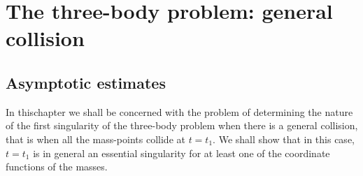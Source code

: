 \chapter{The three-body problem: general collision}\label{chap3}

\section{Asymptotic estimates}\label{chap3:sec1}

In this\pageoriginale chapter we shall be concerned with the problem
of determining the nature of the first singularity of the three-body
problem when there is a general collision, that is when all the
mass-points collide at $t = t_1$. We shall show that in this case, $t
= t_1$ is in general an essential singularity for at least one of the
coordinate functions of the masses. 

